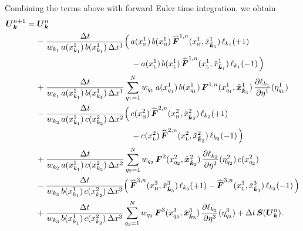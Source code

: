 \documentclass[10pt,preprint]{aastex}
\newcommand{\dx}{\Delta x}
\begin{document}
Combining the terms above with forward Euler time integration, we obtain
\begin{align}
  \bU_{\bk}^{n+1}
  &=\bU_{\bk}^{n} \nonumber \\
  &\hspace{12pt}
  -\f{\dt}{w_{k_{1}}\,a(x_{k_{1}}^{1})\,b(x_{k_{1}}^{1})\,\dx^{1}}
  \Big(\,
    a(x_{\Hgh}^{1})\,b(x_{\Hgh}^{1})\,\widehat{\bF}^{1,n}(x_{\Hgh}^{1},\tilde{x}_{\tilde{\bk}_{1}}^{1})\,\ell_{k_{1}}(+1) \nonumber \\
    &\hspace{128pt}
    -a(x_{\Low}^{1})\,b(x_{\Low}^{1})\,\widehat{\bF}^{1,n}(x_{\Low}^{1},\tilde{x}_{\tilde{\bk}_{1}}^{1})\,\ell_{k_{1}}(-1)
  \,\Big) \nonumber \\
  &\hspace{12pt}
  +\f{\dt}{w_{k_{1}}\,a(x_{k_{1}}^{1})\,b(x_{k_{1}}^{1})\,\dx^{1}}
  \sum_{q_{1}=1}^{N}w_{q_{1}}\,a(x_{q_{1}}^{1})\,b(x_{q_{1}}^{1})\,\bF^{1,n}(x_{q_{1}}^{1},\tilde{\bx}_{\tilde{\bk}_{1}}^{1})\,
  \pderiv{\ell_{k_{1}}}{\eta^{1}}(\eta_{q_{1}}^{1}) \nonumber \\
  &\hspace{12pt}
  -\f{\dt}{w_{k_{2}}\,a(x_{k_{1}}^{1})\,c(x_{k_{2}}^{2})\,\dx^{2}}
  \Big(\,
    c(x_{\Hgh}^{2})\,\widehat{\bF}^{2,n}(x_{\Hgh}^{2},\tilde{x}_{\tilde{\bk}_{2}}^{2})\,\ell_{k_{2}}(+1) \nonumber \\
    &\hspace{128pt}
    -c(x_{\Low}^{2})\,\widehat{\bF}^{2,n}(x_{\Low}^{2},\tilde{x}_{\tilde{\bk}_{2}}^{2})\,\ell_{k_{2}}(-1)
  \,\Big) \nonumber \\
  &\hspace{12pt}
  +\f{\dt}{w_{k_{2}}\,a(x_{k_{1}}^{1})\,c(x_{k_{2}}^{2})\,\dx^{2}}
  \sum_{q_{2}=1}^{N}w_{q_{2}}\,\bF^{2}(x_{q_{2}}^{2},\tilde{\bx}_{\tilde{\bk}_{2}}^{2})\,\pderiv{\ell_{k_{2}}}{\eta^{2}}(\eta_{q_{2}}^{2})\,c(x_{q_{2}}^{2}) \nonumber \\
  &\hspace{12pt}
  -\f{\dt}{w_{k_{3}}\,b(x_{k_{1}}^{1})\,c(x_{k_{2}}^{2})\,\dx^{3}}
  \Big(\,
    \widehat{\bF}^{3,n}(x_{\Hgh}^{3},\tilde{x}_{\tilde{\bk}_{3}}^{3})\,\ell_{k_{3}}(+1)
    -\widehat{\bF}^{3,n}(x_{\Low}^{3},\tilde{x}_{\tilde{\bk}_{3}}^{3})\,\ell_{k_{3}}(-1)
  \,\Big) \nonumber \\
  &\hspace{12pt}
  +\f{\dt}{w_{k_{3}}\,b(x_{k_{1}}^{1})\,c(x_{k_{2}}^{2})\,\dx^{3}}
  \sum_{q_{3}=1}^{N}w_{q_{3}}\,\bF^{3}(x_{q_{3}}^{3},\tilde{\bx}_{\tilde{\bk}_{3}}^{3})\,
  \pderiv{\ell_{k_{3}}}{\eta^{3}}(\eta_{q_{3}}^{3})
  +\dt\,\bS(\bU_{\bk}^{n}).  
\end{align}
\end{document}
